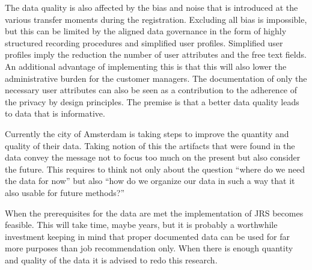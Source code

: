 The data quality is also affected by the bias and noise that is introduced at the various transfer moments during the registration.
Excluding all bias is impossible, but this can be limited by the aligned data governance in the form of highly structured recording procedures and simplified user profiles.
Simplified user profiles imply the reduction the number of user attributes and the free text fields. 
An additional advantage of implementing this is that this will also lower the administrative burden for the customer managers.
The documentation of only the necessary user attributes can also be seen as a contribution to the adherence of the privacy by design principles. 
The premise is that a better data quality leads to data that is informative.

Currently the city of Amsterdam is taking steps to improve the quantity and quality of their data. 
Taking notion of this the artifacts that were found in the data convey the message not to focus too much on the present but also consider the future.
This requires to think not only about the question “where do we need the data for now” but also “how do we organize our data in such a way that it also usable for future methods?”

When the prerequisites for the data are met the implementation of JRS becomes feasible.
This will take time, maybe years, but it is probably a worthwhile  investment keeping in mind that proper documented data can be used for far more purposes than job recommendation only.
When there is enough quantity and quality of the data it is advised to redo this research. 


